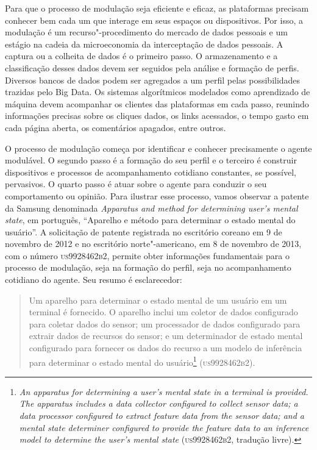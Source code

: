 Para que o processo de modulação seja eficiente e eficaz, as plataformas
precisam conhecer bem cada um que interage em seus espaços ou
dispositivos. Por isso, a modulação é um recurso"-procedimento do mercado
de dados pessoais e um estágio na cadeia da microeconomia da
interceptação de dados pessoais. A captura ou a colheita de dados é o
primeiro passo. O armazenamento e a classificação desses dados devem ser
seguidos pela análise e formação de perfis. Diversos bancos de dados
podem ser agregados a um perfil pelas possibilidades trazidas pelo Big
Data. Os sistemas algorítmicos modelados como aprendizado de máquina
devem acompanhar os clientes das plataformas em cada passo, reunindo
informações precisas sobre os cliques dados, os links acessados, o tempo
gasto em cada página aberta, os comentários apagados, entre outros.

O processo de modulação começa por identificar e conhecer precisamente o
agente modulável. O segundo passo é a formação do seu perfil e o
terceiro é construir dispositivos e processos de acompanhamento
cotidiano constantes, se possível, pervasivos. O quarto passo é atuar
sobre o agente para conduzir o seu comportamento ou opinião. Para
ilustrar esse processo, vamos observar a patente da Samsung denominada
\emph{Apparatus and method for determining user's mental state}, em
português, ``Aparelho e método para determinar o estado mental do
usuário''. A solicitação de patente registrada no escritório coreano em
9 de novembro de 2012 e no escritório norte"-americano, em 8 de novembro
de 2013, com o número \textsc{us9928462b2}, permite obter informações
fundamentais para o processo de modulação, seja na formação do perfil,
seja no acompanhamento cotidiano do agente. Seu resumo é esclarecedor:

\begin{quote}
Um aparelho para determinar o estado mental de um usuário em um terminal
é fornecido. O aparelho inclui um coletor de dados configurado para
coletar dados do sensor; um processador de dados configurado para
extrair dados de recursos do sensor; e um determinador de estado mental
configurado para fornecer os dados do recurso a um modelo de inferência
para determinar o estado mental do usuário\footnote{\emph{An apparatus for
  determining a user's mental state in a terminal is provided. The
  apparatus includes a data collector configured to collect sensor data;
  a data processor configured to extract feature data from the sensor
  data; and a mental state determiner configured to provide the feature
  data to an inference model to determine the user's mental state}
  (\textsc{us9928462b2}, tradução livre).} (\textsc{us9928462b2}).
\end{quote}

